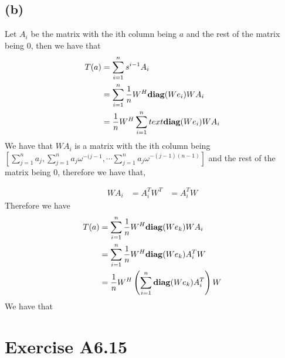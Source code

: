 \subsection*{(b)}
Let $A_i$ be the matrix with the ith column
being $a$ and the rest of the matrix being 0, then we have that 
\begin{align*}
T(a)&=\sum_{i=1}^n s^{i-1}A_i\\
&=\sum_{i=1}^n\frac{1}{n}W^H\text{\textbf{diag}}(We_i)WA_i\\
&=\frac{1}{n}W^H\sum_{i=1}^n text{\textbf{diag}}(We_i)WA_i\\
\end{align*}
We have that $WA_i$ is a matrix
with the ith column being $[\sum_{j=1}^n a_j, \sum_{j=1}^n a_j\omega^{-(j-1}, \cdots \sum_{j=1}^n a_j\omega^{-(j-1)(n-1)}]$
and the rest of the matrix being 0, therefore we have that,



\begin{align*}
    WA_i&=A_i^TW^T
    &=A_i^TW
\end{align*}
Therefore we have 
\begin{align*}
    T(a)&=\sum_{i=1}^n\frac{1}{n}W^H\text{\textbf{diag}}(We_k)WA_i\\
    &=\sum_{i=1}^n\frac{1}{n}W^H\text{\textbf{diag}}(We_k)A_i^TW\\
    &=\frac{1}{n}W^H\left(\sum_{i=1}^n\text{\textbf{diag}}(We_k)A_i^T\right)W
\end{align*}
We have that   
\section*{Exercise A6.15}
